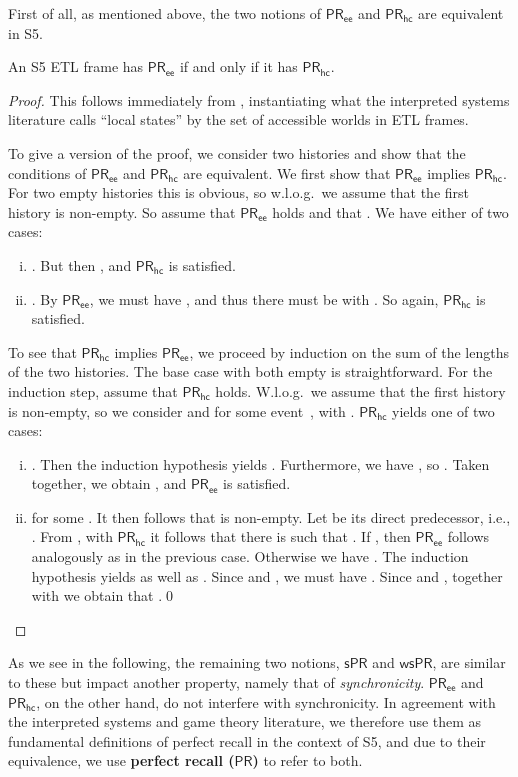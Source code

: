 \documentclass{article}
\newcommand{\PR}{\ensuremath{\mathsf{PR}}\xspace}
\newcommand{\PRs}{\ensuremath{\mathsf{sPR}}\xspace}
\newcommand{\PRsprime}{\ensuremath{\mathsf{wsPR}}\xspace}
\newcommand{\PRhc}{\ensuremath{\mathsf{PR_{hc}}}\xspace}
\newcommand{\PRee}{\ensuremath{\mathsf{PR_{ee}}}\xspace}
\def\dfn{\textbf}
\newcommand{\tiff}{if and only if\xspace}
\newcounter{#1}
\newcommand{\qedhere}{\qed}
\begin{document}
First of all,
as mentioned above,
the two notions of \PRee and \PRhc are equivalent in S5.
\begin{proposition}
  \label{result:pr-ee-equiv-pr-hc}
  An S5 ETL frame has \PRee \tiff it has \PRhc.
\end{proposition}
\begin{proof}
  This follows immediately from \cite[Proposition~2.1]{van_der_meyden_axioms_1993},
  instantiating what the interpreted systems literature calls ``local states''
  by the set of accessible worlds in ETL frames.

  To give a version of the proof,
  we consider two histories and show that the conditions of \PRee and \PRhc are equivalent.
  We first show that \PRee implies \PRhc.
  For two empty histories this is obvious,
  so w.l.o.g.~we assume that the first history is non-empty.
  So assume that \PRee holds and that .
  We have either of two cases:
  \begin{enumerate}[(i)]
  \item . But then , and \PRhc is satisfied.
  \item .
    By \PRee, we must have ,
    and thus there must be  with .
    So again, \PRhc is satisfied.
  \end{enumerate}
  To see that \PRhc implies \PRee, we proceed by induction on the sum of the lengths of the two histories.
  The base case with both empty is straightforward.
  For the induction step, assume that \PRhc holds.
  W.l.o.g.~we assume that the first history is non-empty,
  so we consider  and  for some event~, with .
  \PRhc yields one of two cases:
  \begin{enumerate}[(i)]
  \item . Then the induction hypothesis yields .
    Furthermore, we have , so .
    Taken together, we obtain , and \PRee is satisfied.
  \item  for some .
    It then follows that  is non-empty.
    Let  be its direct predecessor, i.e., .
    From , with \PRhc it follows that there is  such that .
    If , then \PRee follows analogously as in the previous case.
    Otherwise we have .
    The induction hypothesis yields 
    as well as .
    Since  and ,
    we must have .
    Since  and , together with 
    we obtain that .\qedhere
  \end{enumerate}
\end{proof}

As we see in the following, the remaining two notions, \PRs and \PRsprime,
are similar to these but impact another property,
namely that of \emph{synchronicity}.
\PRee and \PRhc, on the other hand, do not interfere with synchronicity.
In agreement with the interpreted systems and game theory literature,
we therefore use them as fundamental definitions of perfect recall in the context of S5,
and due to their equivalence, we use \dfn{perfect recall (\PR)} to refer to both.
\end{document}
